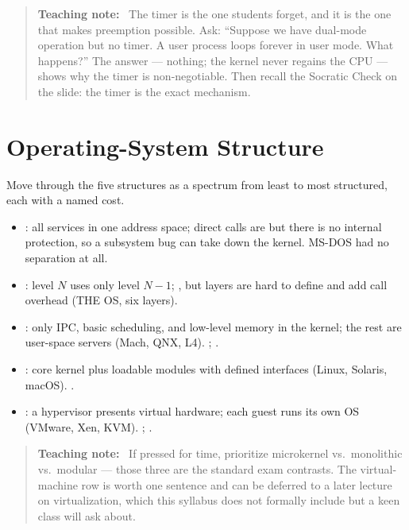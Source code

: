 \documentclass[11pt]{article}
\newenvironment{teachingaside}{\begin{quote}\small\color{primary-gold}\textbf{Teaching note:}\ }{\end{quote}}
\begin{document}
\begin{teachingaside}
The timer is the one students forget, and it is the one that makes preemption possible. Ask: ``Suppose we have dual-mode operation but no timer. A user process loops forever in user mode. What happens?'' The answer --- nothing; the kernel never regains the CPU --- shows why the timer is non-negotiable. Then recall the Socratic Check on the slide: the timer is the exact mechanism.
\end{teachingaside}

\section{Operating-System Structure}

Move through the five structures as a spectrum from least to most structured, each with a named cost.

\begin{itemize}
  \item {}: all services in one address space; direct calls are  but there is no internal protection, so a subsystem bug can take down the kernel. MS-DOS had no separation at all.
  \item {}: level $N$ uses only level $N-1$; , but layers are hard to define and add call overhead (THE OS, six layers).
  \item {}: only IPC, basic scheduling, and low-level memory in the kernel; the rest are user-space servers (Mach, QNX, L4). ; .
  \item {}: core kernel plus loadable modules with defined interfaces (Linux, Solaris, macOS). .
  \item {}: a hypervisor presents virtual hardware; each guest runs its own OS (VMware, Xen, KVM). ; .
\end{itemize}

\begin{teachingaside}
If pressed for time, prioritize microkernel vs.\ monolithic vs.\ modular --- those three are the standard exam contrasts. The virtual-machine row is worth one sentence and can be deferred to a later lecture on virtualization, which this syllabus does not formally include but a keen class will ask about.
\end{teachingaside}
\end{document}

